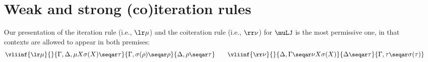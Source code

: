 \section{Weak and strong (co)iteration rules}\label{app:simple-types-with-fixed-points}













Our presentation of the iteration rule (i.e., $\lr\mu$)  and the coiteration rule (i.e., $\rr \nu$) for $\muLJ$ is the most permissive one, in that contexts are allowed to appear in both premises:
 \begin{equation}\label{eqn:strong-2-premises}
      \small
    \vliinf{\lr \mu}{}{\Gamma,\Delta, \mu X \sigma(X)  \seqar \tau}{\Gamma, \sigma(\rho)\seqar \rho}{\Delta, \rho \seqar \tau}
  \qquad
   \vliinf{\rr \nu }{}{ \Delta, \Gamma  \seqar \nu X\sigma(X)}{\Delta \seqar  \tau }{  \Gamma, \tau \seqar \sigma(\tau)}
 \end{equation}

